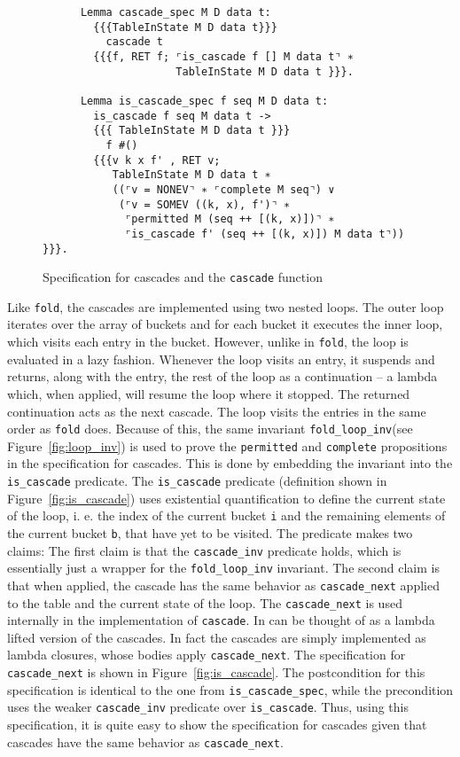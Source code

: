 \documentclass[10pt,a4paper]{article}
\begin{document}
\begin{figure}
\begin{verbatim}
      Lemma cascade_spec M D data t:
        {{{TableInState M D data t}}}
          cascade t
        {{{f, RET f; ⌜is_cascade f [] M data t⌝ ∗
                     TableInState M D data t }}}.

      Lemma is_cascade_spec f seq M D data t:
        is_cascade f seq M data t ->
        {{{ TableInState M D data t }}}
          f #()
        {{{v k x f' , RET v;
           TableInState M D data t ∗
           ((⌜v = NONEV⌝ ∗ ⌜complete M seq⌝) ∨
            (⌜v = SOMEV ((k, x), f')⌝ ∗
             ⌜permitted M (seq ++ [(k, x)])⌝ ∗           
             ⌜is_cascade f' (seq ++ [(k, x)]) M data t⌝)) }}}.
\end{verbatim}
\caption{Specification for cascades and the \texttt{cascade} function}
\label{fig:cascade_spec}
\end{figure}

Like \texttt{fold}, the cascades are implemented using two nested loops. The outer loop iterates over the array of buckets and for each bucket it executes the inner loop, which visits each entry in the bucket. However, unlike in \texttt{fold}, the loop is evaluated in a lazy fashion. Whenever the loop visits an entry, it suspends and returns, along with the entry, the rest of the loop as a continuation -- a lambda which, when applied, will resume the loop where it stopped. The returned continuation acts as the next cascade. The loop visits the entries in the same order as \texttt{fold} does. Because of this, the same invariant \texttt{fold\_loop\_inv}(see Figure~\ref{fig:loop_inv}) is used to prove the \texttt{permitted} and \texttt{complete} propositions in the specification for cascades. This is done by embedding the invariant into the \texttt{is\_cascade} predicate. The \texttt{is\_cascade} predicate (definition shown in Figure~\ref{fig:is_cascade}) uses existential quantification to define the current state of the loop, i. e. the index of the current bucket \texttt{i} and the remaining elements of the current bucket \texttt{b}, that have yet to be visited. The predicate makes two claims: The first claim is that the \texttt{cascade\_inv} predicate holds, which is essentially just a wrapper for the \texttt{fold\_loop\_inv} invariant. The second claim is that when applied, the cascade has the same behavior as \texttt{cascade\_next} applied to the table and the current state of the loop. The \texttt{cascade\_next} is used internally in the implementation of \texttt{cascade}. In can be thought of as a lambda lifted version of the cascades. In fact the cascades are simply implemented as lambda closures, whose bodies apply \texttt{cascade\_next}. The specification for \texttt{cascade\_next} is shown in Figure~\ref{fig:is_cascade}. The postcondition for this specification is identical to the one from \texttt{is\_cascade\_spec}, while the precondition uses the weaker \texttt{cascade\_inv} predicate over \texttt{is\_cascade}. Thus, using this specification, it is quite easy to show the specification for cascades given that cascades have the same behavior as \texttt{cascade\_next}.
\end{document}
